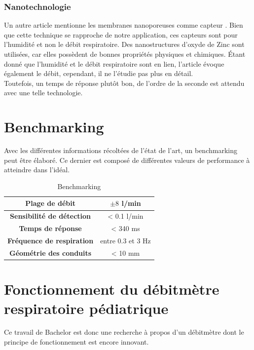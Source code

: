 \subsubsection{Nanotechnologie}
Un autre article mentionne les membranes nanoporeuses comme capteur \cite{moharamzadeh_fabrication_2018}. Bien que cette technique se rapproche 
de notre application, ces capteurs sont pour l'humidité et non le débit respiratoire. Des nanostructures d'oxyde de Zinc sont utilisées, car 
elles possèdent de bonnes propriétés physiques et chimiques. Étant donné que l'humidité et le débit respiratoire sont en lien, l'article évoque 
également le débit, cependant, il ne l'étudie pas plus en détail. \\
Toutefois, un temps de réponse plutôt bon, de l'ordre de la seconde est attendu avec une telle technologie. 

\section{Benchmarking}
Avec les différentes informations récoltées de l'état de l'art, un benchmarking peut être élaboré. Ce dernier est composé de différentes valeurs 
de performance à atteindre dans l'idéal. 

\begin{table}[H]
    \centering
    \begin{tabular}{|c|c|}
        \hline
        \textbf{Plage de débit}           & $\pm 8$ l/min     \\
        \hline
        \textbf{Sensibilité de détection} & < 0.1 l/min       \\
        \hline
        \textbf{Temps de réponse}         & < 340 ms          \\
        \hline
        \textbf{Fréquence de respiration} & entre 0.3 et 3 Hz \\
        \hline
        \textbf{Géométrie des conduits}   & < 10 mm           \\
        \hline
    \end{tabular}
    \caption{Benchmarking}
    \label{fig:benchmarking}
\end{table}


\section{Fonctionnement du débitmètre respiratoire pédiatrique}
Ce travail de Bachelor est donc une recherche à propos d'un débitmètre dont le principe de fonctionnement est encore innovant. \\

